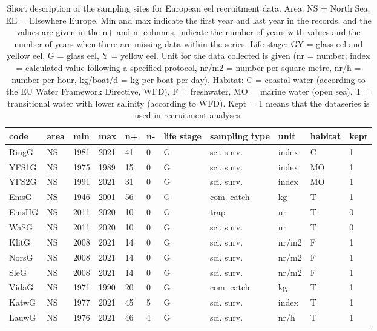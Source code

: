\begin{table}[htbp]
\centering
\caption{Short description of the sampling sites for European eel recruitment data. Area: NS = North Sea, EE = Elsewhere Europe. Min and max indicate the first year and last year in the records, and the values are given in the n+ and n- columns, indicate the number of years with values and the number of years when there are missing data within the series. Life stage: GY = glass eel and yellow eel, G = glass eel, Y = yellow eel. Unit for the data collected is given (nr = number; index = calculated value following a specified protocol, nr/m2 = number per square metre, nr/h = number per hour, kg/boat/d = kg per boat per day). Habitat: C = coastal water (according to the EU Water Framework Directive, WFD), F = freshwater, MO = marine water (open sea), T = transitional water with lower salinity (according to WFD). Kept = 1 means that the dataseries is used in recruitment analyses.} 
\label{statseriesG}
\begin{tabular}{p{1cm}p{1cm}p{1cm}p{1cm}p{0.8cm}p{0.8cm}p{1cm}p{2cm}p{2cm}p{1cm}p{1cm}}
  \hline
code & area & min & max & n+ & n- & life stage & sampling type & unit & habitat & kept \\ 
  \hline
RingG & NS & 1981 & 2021 & 41 & 0 & G & sci. surv. & index & C & 1 \\ 
  YFS1G & NS & 1975 & 1989 & 15 & 0 & G & sci. surv. & index & MO & 1 \\ 
  YFS2G & NS & 1991 & 2021 & 31 & 0 & G & sci. surv. & index & MO & 1 \\ 
  EmsG & NS & 1946 & 2001 & 56 & 0 & G & com. catch & kg & T & 1 \\ 
  EmsHG & NS & 2011 & 2020 & 10 & 0 & G & trap & nr & T & 0 \\ 
  WaSG & NS & 2011 & 2020 & 10 & 0 & G & sci. surv. & nr & T & 0 \\ 
  KlitG & NS & 2008 & 2021 & 14 & 0 & G & sci. surv. & nr/m2 & F & 1 \\ 
  NorsG & NS & 2008 & 2021 & 14 & 0 & G & sci. surv. & nr/m2 & F & 1 \\ 
  SleG & NS & 2008 & 2021 & 14 & 0 & G & sci. surv. & nr/m2 & F & 1 \\ 
  VidaG & NS & 1971 & 1990 & 20 & 0 & G & com. catch & kg & T & 1 \\ 
  KatwG & NS & 1977 & 2021 & 45 & 5 & G & sci. surv. & index & T & 1 \\ 
  LauwG & NS & 1976 & 2021 & 46 & 4 & G & sci. surv. & nr/h & T & 1 \\ 

\end{tabular}
\end{table}
